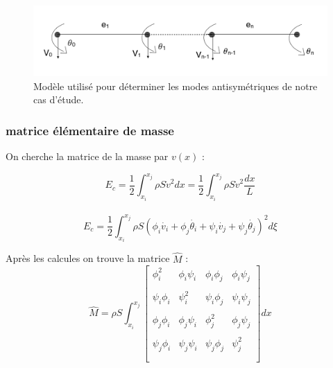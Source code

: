 \documentclass[a4paper,10pt]{report} %
\begin{document}
\begin{figure}[H]
\begin{center}
	\includegraphics[width=1\textwidth]{casVn.png} 
\end{center} 
\caption{Modèle utilisé pour déterminer les modes antisymétriques de notre cas d'étude.}
\end{figure}


\subsubsection{ matrice élémentaire de masse}
On cherche la matrice de la masse  par $v(x)$ :
\begin{center}
$$E_c=\frac{1}{2}\int_{x_i}^{x_j}\rho S\dot{v}^2dx=\frac{1}{2}\int_{x_i}^{x_j}\rho S\dot{v}^2\frac{dx}{L}$$\\
$$E_c=\frac{1}{2}\int_{x_i}^{x_j}\rho S(\phi_i\dot{v_i}+\phi_j\dot{\theta_i}+\psi_i\dot{v_j}+\psi_j\dot{\theta_j})^2d\xi$$
\end{center}

Après les calcules on trouve la matrice $\widehat{M}$ :
\[ \widehat{M}=\rho S\int_{x_i}^{x_j}\left[ \begin{array}{cccc}
\phi_i^2 &\phi_i\psi_i& \phi_i\phi_j&\phi_i\psi_j     \\\\
\psi_i\phi_i & \psi_i^2& \psi_i\phi_j&\psi_i\psi_j \\\\
\phi_j\phi_i &\phi_j\psi_i& \phi_j^2&\phi_j\psi_j     \\\\
\psi_j\phi_i &\psi_j\psi_i&\psi_j \phi_j&\psi_j^2    \\\\
 \end{array} \right]dx\]
 
\end{document}

